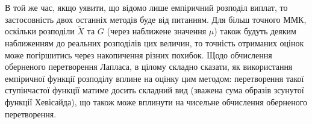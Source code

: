\documentclass{extreport}
\begin{document}
В той же час, якщо уявити, що відомо лише емпіричний розподіл виплат, то застосовність двох останніх методів буде від питанням. 
Для більш точного ММК, оскільки розподіли $\tilde{X}$
та $G$ (через наближене значення $\mu$) також будуть деяким наближенням до реальних розподілів цих величин, то точність отриманих оцінок може погіршитись
через накопичення різних похибок. Щодо обчислення оберненого перетворення Лапласа, в цілому складно сказати,
як використання емпіричної функції розподілу вплине на оцінку цим методом: перетворення такої ступінчастої функції матиме досить складний вид
(зважена сума образів зсунутої функції Хевісайда), що також може вплинути на чисельне обчислення оберненого перетворення.
\end{document}
